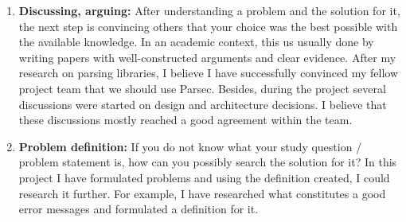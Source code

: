 \begin{enumerate}
    \item \textbf{Discussing, arguing:}
        After understanding a problem and the solution for it, the next step is convincing others that your choice was the best possible with the available knowledge.
        In an academic context, this us usually done by writing papers with well-constructed arguments and clear evidence.
        After my research on parsing libraries, I believe I have successfully convinced my fellow project team that we should use Parsec.
        Besides, during the project several discussions were started on design and architecture decisions.
        I believe that these discussions mostly reached a good agreement within the team.

    \item \textbf{Problem definition:}
        If you do not know what your study question / problem statement is, how can you possibly search the solution for it?
        In this project I have formulated problems and using the definition created, I could research it further.
        For example, I have researched what constitutes a good error messages and formulated a definition for it.
\end{enumerate}

